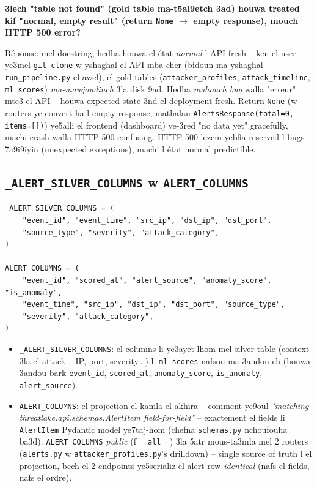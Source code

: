 \documentclass[11pt,a4paper]{report}
\DeclareRobustCommand{\code}[1]{\texttt{#1}}
\begin{document}
\begin{soual}
\textbf{3lech "table not found" (gold table ma-t5al9etch 3ad) houwa treated
kif "normal, empty result" (return \code{None} $\to$ empty response),
mouch HTTP 500 error?}

Réponse: mel docstring, hedha houwa el état \emph{normal} l API fresh --
ken el user ye3mel \code{git clone} w yshaghal el API mba-cher (bidoun ma
yshaghal \code{run\_pipeline.py} el awel), el gold tables (\code{attacker\_profiles},
\code{attack\_timeline}, \code{ml\_scores}) \emph{ma-mawjoudinch} 3la disk
9ad. Hedha \emph{mahouch bug} walla "erreur" mte3 el API -- houwa expected
state 3nd el deployment fresh. Return \code{None} (w routers ye-convert-ha
l empty response, mathalan \code{AlertsResponse(total=0, items=[])}) ye5alli
el frontend (dashboard) ye-3red "no data yet" gracefully, machi crash walla
HTTP 500 confusing. HTTP 500 lezem yeb9a reserved l bugs 7a9i9iyin
(unexpected exceptions), machi l état normal predictible.
\end{soual}

\subsection{\code{\_ALERT\_SILVER\_COLUMNS} w \code{ALERT\_COLUMNS}}

\begin{lstlisting}[style=pystyle]
_ALERT_SILVER_COLUMNS = (
    "event_id", "event_time", "src_ip", "dst_ip", "dst_port",
    "source_type", "severity", "attack_category",
)

ALERT_COLUMNS = (
    "event_id", "scored_at", "alert_source", "anomaly_score", "is_anomaly",
    "event_time", "src_ip", "dst_ip", "dst_port", "source_type",
    "severity", "attack_category",
)
\end{lstlisting}

\begin{itemize}
  \item \code{\_ALERT\_SILVER\_COLUMNS}: el columns li ye3ayet-lhom mel
        silver table (context 3la el attack -- IP, port, severity...)
        li \code{ml\_scores} nafsou ma-3andou-ch (houwa 3andou bark
        \code{event\_id}, \code{scored\_at}, \code{anomaly\_score},
        \code{is\_anomaly}, \code{alert\_source}).
  \item \code{ALERT\_COLUMNS}: el projection el kamla el akhira -- comment
        ye9oul \emph{"matching threatlake.api.schemas.AlertItem
        field-for-field"} -- exactement el fields li \code{AlertItem}
        Pydantic model ye7taj-hom (chefna \code{schemas.py} nchoufouha
        ba3d). \code{ALERT\_COLUMNS} \emph{public} (f \code{\_\_all\_\_})
        3la 5atr mous-ta3mla mel 2 routers (\code{alerts.py} w
        \code{attacker\_profiles.py}'s drilldown) -- single source of
        truth l el projection, bech el 2 endpoints ye5serializ el alert
        row \emph{identical} (nafs el fields, nafs el ordre).
\end{itemize}
\end{document}

